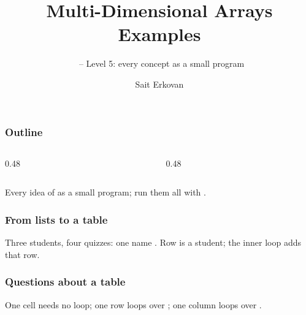 \documentclass[aspectratio=169,10pt,compress]{beamer}
\title[Arrays ND: Examples]{
	Multi-Dimensional Arrays\\
	Examples
}
\subtitle{
	\cisOOO\ -- Level 5: every concept as a small program
}
\author[Erkovan]{Sait Erkovan}
\institute[FCIS]{
	Faculty of Computer and Information Sciences\\
	Yeditepe University
}
\date{{\tiny \hbTimeStamp}}
\begin{document}
\begin{frame}[t,fragile]
	\titlepage
\end{frame}




\begin{frame}[t,fragile] \frametitle{Outline}
	\begin{columns}[T]
		\begin{column}{0.48\textwidth}
			\tableofcontents[sections={1-4}, hideallsubsections]
		\end{column}
		\begin{column}{0.48\textwidth}
			\tableofcontents[sections={5-7}, hideallsubsections]
		\end{column}
	\end{columns}

	\vspace{1em}
	\small Every idea of  as a small program; run them all with .
\end{frame}








\begin{frame}[t,fragile] \frametitle{From lists to a table}

	\footnotesize Three students, four quizzes: one name . Row  is a student; the inner loop adds that row.
\end{frame}




\begin{frame}[t,fragile] \frametitle{Questions about a table}

	\footnotesize One cell needs no loop; one row loops over ; one column loops over .
\end{frame}
\end{document}
